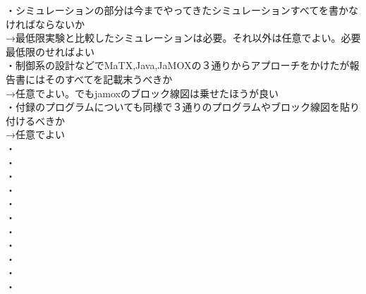 ・シミュレーションの部分は今までやってきたシミュレーションすべてを書かなければならないか\\
→最低限実験と比較したシミュレーションは必要。それ以外は任意でよい。必要最低限のせればよい\\
・制御系の設計などでMaTX,Java,JaMOXの３通りからアプローチをかけたが報告書にはそのすべてを記載末うべきか\\
→任意でよい。でもjamoxのブロック線図は乗せたほうが良い\\
・付録のプログラムについても同様で３通りのプログラムやブロック線図を貼り付けるべきか\\
→任意でよい\\
・\\
・\\
・\\
・\\
・\\
・\\
・\\
・\\
・\\
・\\
・\\

